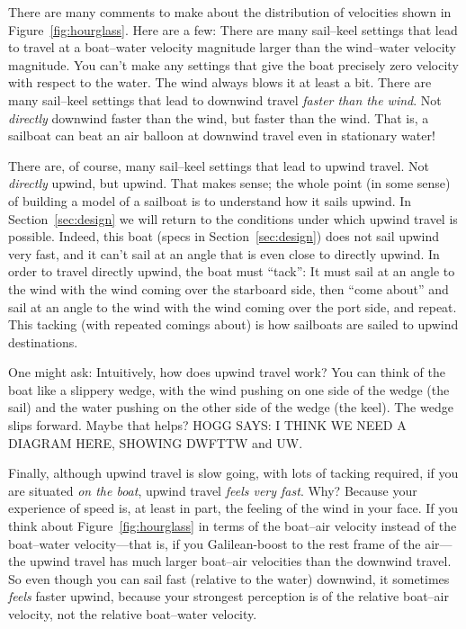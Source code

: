 \documentclass[letterpaper]{article}
\newcommand{\secref}[1]{Section~\ref{#1}}
\newcommand{\figref}[1]{Figure~\ref{#1}}
\begin{document}
There are many comments to make about the distribution of velocities shown in \figref{fig:hourglass}.
Here are a few:
There are many sail--keel settings that lead to travel at a boat--water velocity magnitude larger than the wind--water velocity magnitude.
You can't make any settings that give the boat precisely zero velocity with respect to the water.
The wind always blows it at least a bit.
There are many sail--keel settings that lead to downwind travel \emph{faster than the wind}.
Not \emph{directly} downwind faster than the wind, but faster than the wind.
That is, a sailboat can beat an air balloon at downwind travel even in stationary water!

There are, of course, many sail--keel settings that lead to upwind travel.
Not \emph{directly} upwind, but upwind.
That makes sense; the whole point (in some sense) of building a model of a sailboat is to understand how it sails upwind.
In \secref{sec:design} we will return to the conditions under which upwind travel is possible.
Indeed, this boat (specs in \secref{sec:design}) does not sail upwind very fast, and it can't sail at an angle that is even close to directly upwind.
In order to travel directly upwind, the boat must ``tack'': It must sail at an angle to the wind with the wind coming over the starboard side, then ``come about'' and sail at an angle to the wind with the wind coming over the port side, and repeat.
This tacking (with repeated comings about) is how sailboats are sailed to upwind destinations.

One might ask: Intuitively, how does upwind travel work?
You can think of the boat like a slippery wedge, with the wind pushing on one side of the wedge (the sail) and the water pushing on the other side of the wedge (the keel).
The wedge slips forward.
Maybe that helps?
HOGG SAYS: I THINK WE NEED A DIAGRAM HERE, SHOWING DWFTTW and UW.

Finally, although upwind travel is slow going, with lots of tacking required, if you are situated \emph{on the boat}, upwind travel \emph{feels very fast}.
Why?
Because your experience of speed is, at least in part, the feeling of the wind in your face.
If you think about \figref{fig:hourglass} in terms of the boat--air velocity instead of the boat--water velocity---that is, if you Galilean-boost to the rest frame of the air---the upwind travel has much larger boat--air velocities than the downwind travel.
So even though you can sail fast (relative to the water) downwind, it sometimes \emph{feels} faster upwind, because your strongest perception is of the relative boat--air velocity, not the relative boat--water velocity.
\end{document}

